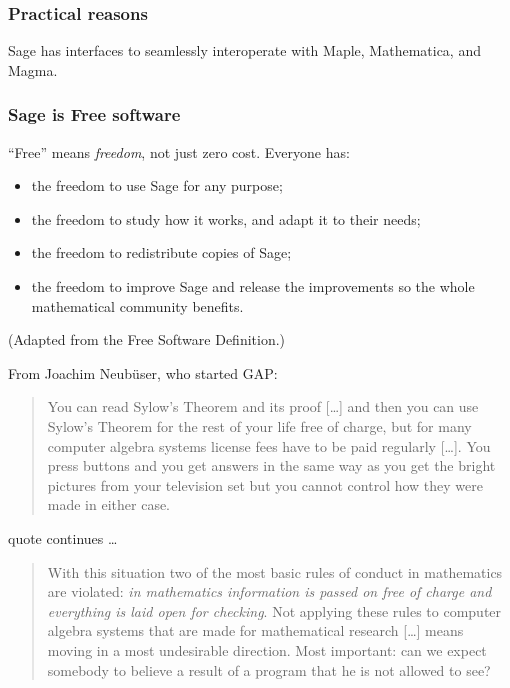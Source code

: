 \documentclass{beamer}
\begin{document}
\begin{frame}
  \frametitle{Practical reasons}
  
  Sage has interfaces to seamlessly interoperate with Maple,
  Mathematica, and Magma.

\end{frame}

\begin{frame}
  \frametitle{Sage is Free software}

  ``Free'' means \emph{freedom}, not just zero cost. Everyone has:

  \begin{itemize}
  \pause
  \item the freedom to use Sage for any purpose;
  \pause
  \item the freedom to study how it works, and adapt it to their needs;
  \pause
  \item the freedom to redistribute copies of Sage;
  \pause
  \item the freedom to improve Sage and release the improvements so the
    whole mathematical community benefits.
  \end{itemize}
  \pause

  (Adapted from the Free Software Definition.)

\end{frame}

\begin{frame}
  
  From Joachim Neub\"user, who started GAP:

  \begin{quote}
    You can read Sylow's Theorem and its proof [\ldots] and then you can
    use Sylow's Theorem for the rest of your life free of charge, but
    for many computer algebra systems license fees have to be paid
    regularly [\ldots]. You press buttons and you get answers in the
    same way as you get the bright pictures from your television set but
    you cannot control how they were made in either case.
  \end{quote}

  \vfill

  \hfill quote continues \ldots

\end{frame}

\begin{frame}

  \begin{quote}
    With this situation two of the most basic rules of conduct in
    mathematics are violated: \emph{in mathematics information is passed
      on free of charge and everything is laid open for checking}. Not
    applying these rules to computer algebra systems that are made for
    mathematical research [\ldots] means moving in a most undesirable
    direction. Most important: can we expect somebody to believe a
    result of a program that he is not allowed to see?
  \end{quote}

\end{frame}
\end{document}
